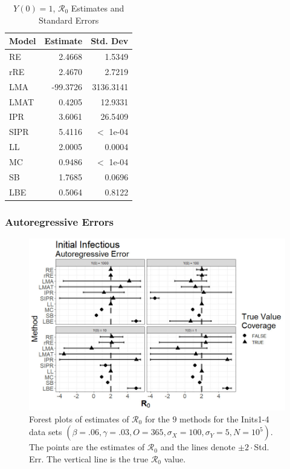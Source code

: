 \documentclass[12pt]{article}
\newcommand{\xxsir}{\ensuremath{9} } %
\newcommand{\rr}{\ensuremath{\mathcal{R}_0}}
\begin{document}
\begin{table}[H]
	
	\centering
	\begin{tabular}[t]{l|r|r}
		\hline
		Model & Estimate & Std. Dev\\
		\hline
		RE & 2.4668 & 1.5349\\
		\hline
		rRE & 2.4670 & 2.7219\\
		\hline
		LMA & -99.3726 & 3136.3141\\
		\hline
		LMAT & 0.4205 & 12.9331\\
		\hline
		IPR & 3.6061 & 26.5409\\
		\hline
		SIPR & 5.4116 & $<$ 1e-04\\
		\hline
		LL & 2.0005 & 0.0004\\
		\hline
		MC & 0.9486 & $<$ 1e-04\\
		\hline
		SB & 1.7685 & 0.0696\\
		\hline
		LBE & 0.5064 & 0.8122\\
		\hline
	\end{tabular}
	\caption{$Y(0) = 1$, $\rr$ Estimates and Standard Errors}
\end{table}


\subsubsection{Autoregressive Errors}

\begin{figure}[H]
	\centering
	\includegraphics[scale=0.5]{images/start_ar.jpg}
	\caption{Forest plots of estimates of $\rr$ for the \xxsir methods for the Inits1-4 data sets $(\beta=.06, \gamma=.03, O=365, \sigma_X=100, \sigma_Y=5, N=10^5)$.  The points are the estimates of $\rr$ and the lines denote $\pm 2\cdot $Std. Err.  The vertical line is the true $\rr$ value.}
\end{figure}
\end{document}
